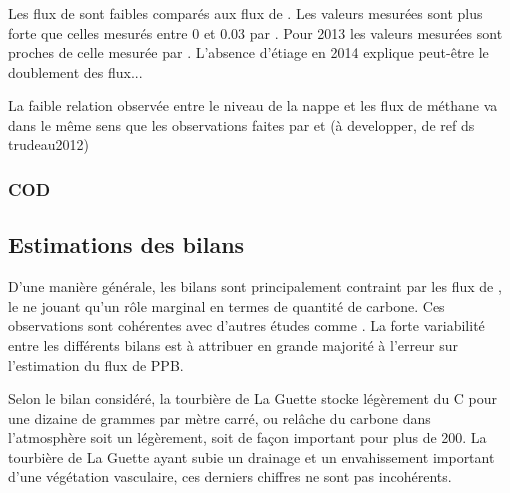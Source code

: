 
\subsubsection{\chh}
Les flux de \chh sont faibles comparés aux flux de \coo.
Les valeurs mesurées sont plus forte que celles mesurés entre \num{0} et \SI{0.03}{\uml} par \citet{bortoluzzi2006}.
Pour 2013 les valeurs mesurées sont proches de celle mesurée par \citet{long2010}.
L'absence d'étiage en 2014 explique peut-être le doublement des flux... \plop

La faible relation observée entre le niveau de la nappe et les flux de méthane va dans le même sens que les observations faites par \citet{trudeau2012} et (à developper, de ref ds trudeau2012)



\subsubsection{COD}

\subsection{Estimations des bilans}

D'une manière générale, les bilans sont principalement contraint par les flux de \coo, le \chh ne jouant qu'un rôle marginal en termes de quantité de carbone.
Ces observations sont cohérentes avec d'autres études comme \citet{bortoluzzi2006,worrall2009}.
La forte variabilité entre les différents bilans est à attribuer en grande majorité à l'erreur sur l'estimation du flux de PPB.

Selon le bilan considéré, la tourbière de La Guette stocke légèrement du C pour une dizaine de grammes par mètre carré, ou relâche du carbone dans l'atmosphère soit un légèrement, soit de façon important pour plus de \SI{200}{\gcma}.
La tourbière de La Guette ayant subie un drainage et un envahissement important d'une végétation vasculaire, ces derniers chiffres ne sont pas incohérents.




